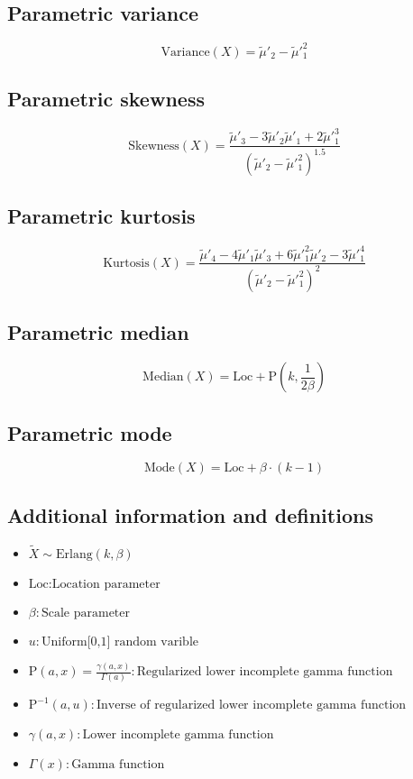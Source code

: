 \documentclass{article}
\begin{document}
\subsection{Parametric variance}
\begin{equation*} \mathrm{Variance}(X)=\tilde{\mu}'_{2}-\tilde{\mu}'^{2}_{1} \end{equation*}
\subsection{Parametric skewness}
\begin{equation*} \mathrm{Skewness}(X)=\frac{\tilde{\mu}'_{3}-3\tilde{\mu}'_{2}\tilde{\mu}'_{1}+2\tilde{\mu}'^{3}_{1}}{(\tilde{\mu}'_{2}-\tilde{\mu}'^{2}_{1})^{1.5}} \end{equation*}
\subsection{Parametric kurtosis}
\begin{equation*} \mathrm{Kurtosis}(X)=\frac{\tilde{\mu}'_{4}-4\tilde{\mu}'_{1}\tilde{\mu}'_{3}+6\tilde{\mu}'^{2}_{1}\tilde{\mu}'_{2}-3\tilde{\mu}'^{4}_{1}}{(\tilde{\mu}'_{2}-\tilde{\mu}'^{2}_{1})^{2}} \end{equation*}
\subsection{Parametric median}
\begin{equation*} \mathrm{Median}(X)=\text{Loc}+\text{P}(k,\frac{1}{2\beta}) \end{equation*}
\subsection{Parametric mode}
\begin{equation*} \mathrm{Mode}(X)=\text{Loc}+\beta\cdot\left(k-1\right) \end{equation*}
\subsection{Additional information and definitions}
\begin{itemize}
    \item $ \tilde{X}\sim\mathrm{Erlang}\left(k,\beta\right) $
    \item $ \text{Loc}:\text{Location parameter} $
    \item $ \beta:\text{Scale parameter} $
    \item $ u:\text{Uniform[0,1] random varible} $
    \item $ \text{P}\left(a,x\right)=\frac{\gamma(a,x)}{\Gamma(a)}:\text{Regularized lower incomplete gamma function} $
    \item $ \text{P}^{-1}\left(a,u\right):\text{Inverse of regularized lower incomplete gamma function} $
    \item $ \gamma\left(a,x\right):\text{Lower incomplete gamma function} $
    \item $ \Gamma\left(x\right):\text{Gamma function} $
\end{itemize}
\end{document}
